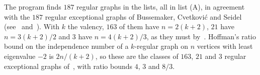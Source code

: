 The program  finds $187$ regular graphs in the lists, all in list (A), in
agreement with the $187$ regular exceptional graphs of Bussemaker, Cvetkovi\'c and
Seidel~\cite{BCS} (see~\cite[\S3.11]{BCN89} and~\cite{DBvV26}). With $k$ the valency, $163$ of
them have $n=2(k+2)$, $21$ have $n=3(k+2)/2$ and $3$ have $n=4(k+2)/3$, as they must
by~\cite[Theorem~3.12.2]{BCN89}. Hoffman's ratio bound on the independence number of a
$k$-regular graph on $n$ vertices with least eigenvalue $-2$ is $2n/(k+2)$, so these are the
classes of $163$, $21$ and $3$ regular exceptional graphs of~\cite{DBvV26}, with ratio bounds
$4$, $3$ and $8/3$.
